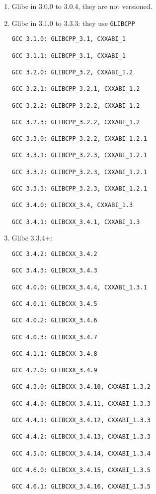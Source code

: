 \begin{enumerate}
  \item  Glibc in 3.0.0 to 3.0.4, they are not versioned.
  
  
  \item Glibc in 3.1.0 to 3.3.3: they use \verb!GLIBCPP!

{\tiny
\begin{verbatim}
GCC 3.1.0: GLIBCPP_3.1, CXXABI_1

GCC 3.1.1: GLIBCPP_3.1, CXXABI_1

GCC 3.2.0: GLIBCPP_3.2, CXXABI_1.2

GCC 3.2.1: GLIBCPP_3.2.1, CXXABI_1.2

GCC 3.2.2: GLIBCPP_3.2.2, CXXABI_1.2

GCC 3.2.3: GLIBCPP_3.2.2, CXXABI_1.2

GCC 3.3.0: GLIBCPP_3.2.2, CXXABI_1.2.1

GCC 3.3.1: GLIBCPP_3.2.3, CXXABI_1.2.1

GCC 3.3.2: GLIBCPP_3.2.3, CXXABI_1.2.1

GCC 3.3.3: GLIBCPP_3.2.3, CXXABI_1.2.1

GCC 3.4.0: GLIBCXX_3.4, CXXABI_1.3

GCC 3.4.1: GLIBCXX_3.4.1, CXXABI_1.3
\end{verbatim}
}
   \item Glibc 3.3.4+:
   
{\tiny 
\begin{verbatim}
GCC 3.4.2: GLIBCXX_3.4.2

GCC 3.4.3: GLIBCXX_3.4.3

GCC 4.0.0: GLIBCXX_3.4.4, CXXABI_1.3.1

GCC 4.0.1: GLIBCXX_3.4.5

GCC 4.0.2: GLIBCXX_3.4.6

GCC 4.0.3: GLIBCXX_3.4.7

GCC 4.1.1: GLIBCXX_3.4.8

GCC 4.2.0: GLIBCXX_3.4.9

GCC 4.3.0: GLIBCXX_3.4.10, CXXABI_1.3.2

GCC 4.4.0: GLIBCXX_3.4.11, CXXABI_1.3.3

GCC 4.4.1: GLIBCXX_3.4.12, CXXABI_1.3.3

GCC 4.4.2: GLIBCXX_3.4.13, CXXABI_1.3.3

GCC 4.5.0: GLIBCXX_3.4.14, CXXABI_1.3.4

GCC 4.6.0: GLIBCXX_3.4.15, CXXABI_1.3.5

GCC 4.6.1: GLIBCXX_3.4.16, CXXABI_1.3.5


\end{verbatim}}
\end{enumerate}
